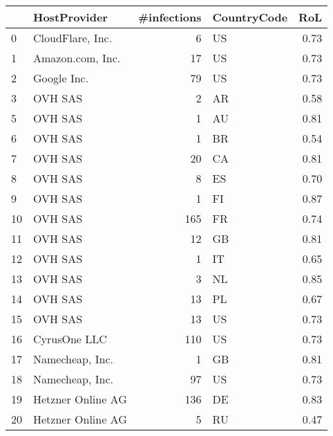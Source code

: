 \begin{tabular}{llrlr}
\toprule
{} &                           HostProvider &  \#infections & CountryCode &   RoL \\
\midrule
0  &                       CloudFlare, Inc. &            6 &          US &  0.73 \\
1  &                       Amazon.com, Inc. &           17 &          US &  0.73 \\
2  &                            Google Inc. &           79 &          US &  0.73 \\
3  &                                OVH SAS &            2 &          AR &  0.58 \\
5  &                                OVH SAS &            1 &          AU &  0.81 \\
6  &                                OVH SAS &            1 &          BR &  0.54 \\
7  &                                OVH SAS &           20 &          CA &  0.81 \\
8  &                                OVH SAS &            8 &          ES &  0.70 \\
9  &                                OVH SAS &            1 &          FI &  0.87 \\
10 &                                OVH SAS &          165 &          FR &  0.74 \\
11 &                                OVH SAS &           12 &          GB &  0.81 \\
12 &                                OVH SAS &            1 &          IT &  0.65 \\
13 &                                OVH SAS &            3 &          NL &  0.85 \\
14 &                                OVH SAS &           13 &          PL &  0.67 \\
15 &                                OVH SAS &           13 &          US &  0.73 \\
16 &                           CyrusOne LLC &          110 &          US &  0.73 \\
17 &                        Namecheap, Inc. &            1 &          GB &  0.81 \\
18 &                        Namecheap, Inc. &           97 &          US &  0.73 \\
19 &                      Hetzner Online AG &          136 &          DE &  0.83 \\
20 &                      Hetzner Online AG &            5 &          RU &  0.47 \\

\end{tabular}
